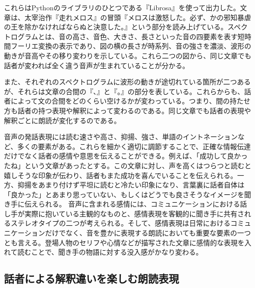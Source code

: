 これらはPythonのライブラリのひとつである『Librosa\cite{librosa}』を使って出力した。文章は、太宰治作『走れメロス\cite{Dazai}』の冒頭『メロスは激怒した。必ず、かの邪知暴虐の王を除かなければならぬと決意した。』という部分を読み上げている。スペクトログラムとは、音の高さ、音色、大きさ、長さといった音の四要素を表す短時間フーリエ変換の表示であり、図の横の長さが時系列、音の強さを濃淡、波形の動きが音高やその移り変わりを示している。これら二つの図から、同じ文章でも話者が変われば全く違う音声が生まれていることが分かる。

また、それぞれのスペクトログラムに波形の動きが途切れている箇所が二つあるが、それらは文章の合間の『、』と『。』の部分を表している。これらからも、話者によって文の合間をどのくらい空けるかが変わっている。つまり、間の持たせ方も話者の持つ表現や解釈によって変わるのである。同じ文章でも話者の表現や解釈ごとに朗読が変化するのである。


音声の発話表現には読む速さや高さ、抑揚、強さ、単語のイントネーションなど、多くの要素がある。これらを細かく適切に調節することで、正確な情報伝達だけでなく話者の感情や意思を伝えることができる。例えば、「成功して良かったね」という文章があったとする。この文章に対し、声を高くはつらつと読むと嬉しそうな印象が伝わり、話者もまた成功を喜んでいることを伝えられる。一方、抑揚をあまり付けず平坦に読むと冷たい印象になり、言葉裏に話者自体は「良かった」とあまり思っていない、もしくはどうでも良さそうなイメージを聞き手に伝えられる。
音声に含まれる感情には、コミュニケーションにおける話し手が実際に抱いている主観的なものと、感情表現を客観的に聞き手に共有されるステレオタイプの二つが考えられる\cite{sutereo}。そして、感情表現は日常におけるコミュニケーションだけでなく、音を豊かに表現する朗読においても重要な要素の一つとも言える。登場人物のセリフや心情などが描写された文章に感情的な表現を入れて読むことで、聞き手の物語に対する没入感がかなり変わる。





\subsection{話者による解釈違いを楽しむ朗読表現}\label{kaishaku}


